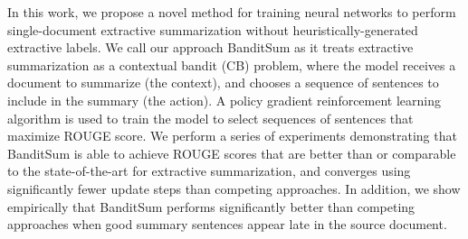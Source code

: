 In this work, we propose a novel method for training neural networks to perform single-document extractive summarization without heuristically-generated extractive labels. We call our approach BanditSum as it treats extractive summarization as a contextual bandit (CB) problem, where the model receives a document to summarize (the context), and chooses a sequence of sentences to include in the summary (the action). A policy gradient reinforcement learning algorithm is used to train the model to select sequences of sentences that maximize ROUGE score. We perform a series of experiments demonstrating that BanditSum is able to achieve ROUGE scores that are better than or comparable to the state-of-the-art for extractive summarization, and converges using significantly fewer update steps than competing approaches. In addition, we show empirically that BanditSum performs significantly better than competing approaches when good summary sentences appear late in the source document.

